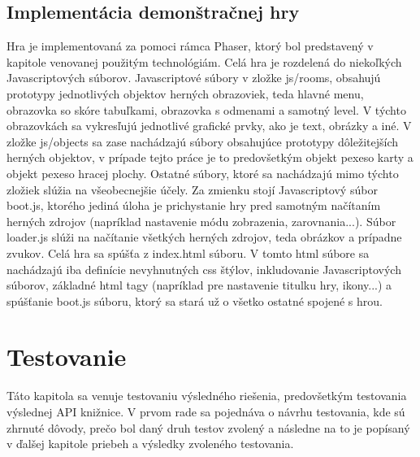 \section{Implementácia demonštračnej hry}
Hra je implementovaná za pomoci rámca Phaser, ktorý bol predstavený v kapitole venovanej použitým technológiám. Celá hra je rozdelená do niekoľkých Javascriptových súborov. Javascriptové súbory v zložke js/rooms, obsahujú prototypy jednotlivých objektov herných obrazoviek, teda hlavné menu, obrazovka so skóre tabuľkami, obrazovka s odmenami a samotný level.  V týchto obrazovkách sa vykresľujú jednotlivé grafické prvky, ako je text, obrázky a iné. V zložke  js/objects sa zase nachádzajú súbory obsahujúce prototypy dôležitejších herných objektov, v prípade tejto práce je to predovšetkým objekt pexeso karty a objekt pexeso hracej plochy. Ostatné súbory, ktoré sa nachádzajú mimo týchto zložiek slúžia na všeobecnejšie účely. Za zmienku stojí Javascriptový súbor boot.js, ktorého jediná úloha je prichystanie hry pred samotným načítaním herných zdrojov (napríklad nastavenie módu zobrazenia, zarovnania...). Súbor loader.js slúži na načítanie všetkých herných zdrojov, teda obrázkov a prípadne zvukov. Celá hra sa spúšťa z index.html súboru. V tomto html súbore sa nachádzajú iba definície nevyhnutných css štýlov, inkludovanie Javascriptových súborov, základné html tagy (napríklad pre nastavenie titulku hry, ikony...) a spúšťanie boot.js súboru, ktorý sa stará už o všetko ostatné spojené s hrou.

\chapter{Testovanie}
\label{chap:testovanie}
Táto kapitola sa venuje testovaniu výsledného riešenia, predovšetkým testovania výslednej API knižnice. V prvom rade sa pojednáva o návrhu testovania, kde sú zhrnuté dôvody, prečo bol daný druh testov zvolený a následne na to je popísaný v ďalšej kapitole priebeh a výsledky zvoleného testovania.

